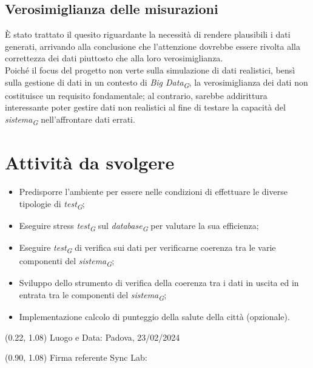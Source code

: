 \documentclass{article}
\begin{document}
    \subsection{Verosimiglianza delle misurazioni}
    È stato trattato il quesito riguardante la necessità di rendere plausibili i dati generati, arrivando alla conclusione che l'attenzione dovrebbe essere rivolta alla correttezza dei dati piuttosto che alla loro verosimiglianza.\\
    Poiché il focus del progetto non verte sulla simulazione di dati realistici, bensì sulla gestione di dati in un contesto di \textit{Big Data}\textsubscript{\textit{G}}, la verosimiglianza dei dati non costituisce un requisito fondamentale; al contrario, sarebbe addirittura interessante poter gestire dati non realistici al fine di testare la capacità del \textit{sistema}\textsubscript{\textit{G}} nell'affrontare dati errati.
\section{Attività da svolgere}
    \begin{itemize}
        \item Predisporre l'ambiente per essere nelle condizioni di effettuare le diverse tipologie di \textit{test}\textsubscript{\textit{G}};
        \item Eseguire stress \textit{test}\textsubscript{\textit{G}} sul \textit{database}\textsubscript{\textit{G}} per valutare la sua efficienza;
        \item Eseguire \textit{test}\textsubscript{\textit{G}} di verifica sui dati per verificarne coerenza tra le varie componenti del \textit{sistema}\textsubscript{\textit{G}};
        \item Sviluppo dello strumento di verifica della coerenza tra i dati in uscita ed in entrata tra le componenti del \textit{sistema}\textsubscript{\textit{G}};
        \item Implementazione calcolo di punteggio della salute della città (opzionale).
    \end{itemize}

\begin{textblock*}{\textwidth}(0.22\textwidth, 1.08\textheight)
    Luogo e Data: Padova, 23/02/2024
\end{textblock*}

\begin{textblock*}{\textwidth}(0.90\textwidth, 1.08\textheight)
        Firma referente Sync Lab:
\end{textblock*}
\end{document}
